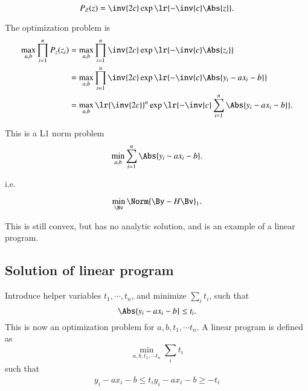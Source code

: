 \begin{equation}\label{eqn:L1introduction:460}
P_Z(z) = \inv{2 c} \exp\lr{ -\inv{c} \Abs{z} }.
\end{equation}

The optimization problem is
\begin{equation}\label{eqn:L1introduction:480}
\begin{aligned}
\max_{a,b} \prod_{i = 1}^n P_z(z_i)
&= \max_{a,b} \prod_{i = 1}^n \inv{2 c} \exp\lr{ -\inv{c} \Abs{z_i} } \\
&= \max_{a,b} \prod_{i = 1}^n \inv{2 c} \exp\lr{ -\inv{c} \Abs{y_i - a x_i - b} } \\
&= \max_{a,b} \lr{\inv{2 c}}^n \exp\lr{ -\inv{c} \sum_{i=1}^n \Abs{y_i - a x_i - b} }.
\end{aligned}
\end{equation}

This is a L1 norm problem
\begin{equation}\label{eqn:L1introduction:500}
\min_{a,b} \sum_{i = 1}^n \Abs{ y_i - a x_i - b }.
\end{equation}

i.e.

\begin{equation}\label{eqn:L1introduction:520}
\min_\Bv \Norm{ \By - H \Bv }_1.
\end{equation}

This is still convex, but has no analytic solution, and is an example of a linear program.
\subsection{Solution of linear program}
Introduce helper variables \( t_1, \cdots, t_n \), and
minimize \( \sum_i t_i \), such that
\begin{equation}\label{eqn:L1introduction:540}
\Abs{ y_i - a x_i - b } \le t_i.
\end{equation}
This is now an optimization problem for \( a, b, t_1, \cdots t_n \).  A linear program is defined as
\begin{equation}\label{eqn:L1introduction:560}
\min_{a, b, t_1, \cdots t_n} \sum_i t_i
\end{equation}
such that
\begin{equation}\label{eqn:L1introduction:580}
\begin{aligned}
y_i - a x_i - b \le t_i
y_i - a x_i - b \ge -t_i
\end{aligned}
\end{equation}

